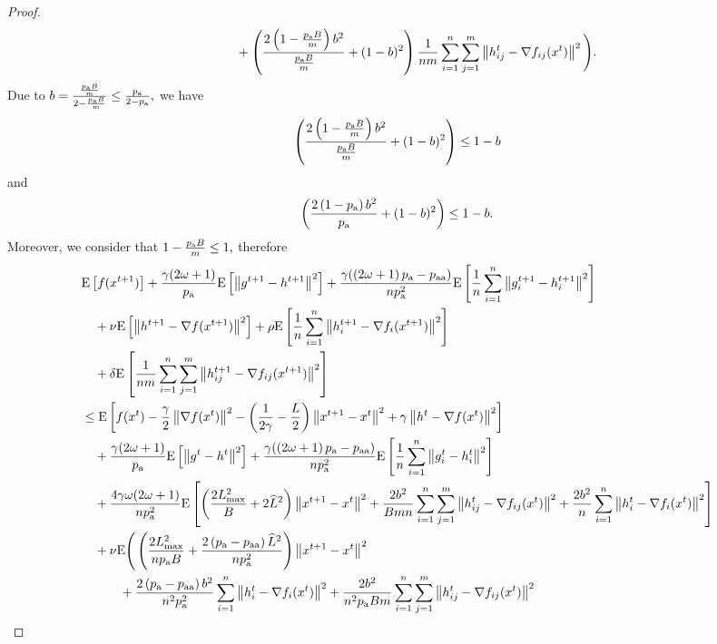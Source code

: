 \documentclass{article}
\newcommand*{\probavailable}{\ensuremath{p_{\textnormal{a}}}}
\newcommand*{\probpairaa}{\ensuremath{p_{\textnormal{aa}}}}
\begin{document}
\begin{proof}
\begin{align*}
      &\qquad\quad + \left(\frac{2\left(1 - \frac{\probavailable B}{m}\right) b^2}{\frac{\probavailable B}{m}} + (1 - b)^2\right) \frac{1}{nm} \sum_{i=1}^n \sum_{j=1}^m \norm{h^t_{ij} - \nabla f_{ij}(x^{t})}^2\Bigg).\\
    \end{align*}
    Due to $b = \frac{\frac{\probavailable B}{m}}{2 - \frac{\probavailable B}{m}} \leq \frac{\probavailable}{2 - \probavailable},$ we have 
    $$\left(\frac{2\left(1 - \frac{\probavailable B}{m}\right) b^2}{\frac{\probavailable B}{m}} + (1 - b)^2\right) \leq 1 - b$$
    and
    $$\left(\frac{2 \left(1 - \probavailable\right) b^2}{\probavailable} + (1 - b)^2\right) \leq 1 - b.$$
    Moreover, we consider that $1 - \frac{\probavailable B}{m} \leq 1,$ therefore
    \begin{align*}
      &\Exp{f(x^{t + 1})} + \frac{\gamma (2 \omega + 1)}{\probavailable} \Exp{\norm{g^{t+1} - h^{t+1}}^2} + \frac{\gamma (\left(2 \omega + 1\right)\probavailable - \probpairaa)}{n \probavailable^2} \Exp{\frac{1}{n}\sum_{i=1}^n\norm{g^{t+1}_i - h^{t+1}_i}^2}\\
      &\quad  + \nu \Exp{\norm{h^{t+1} - \nabla f(x^{t+1})}^2} + \rho \Exp{\frac{1}{n}\sum_{i=1}^n\norm{h^{t+1}_i - \nabla f_i(x^{t+1})}^2}\\
      &\quad + \delta \Exp{\frac{1}{nm}\sum_{i=1}^n\sum_{j=1}^m\norm{h^{t+1}_{ij} - \nabla f_{ij}(x^{t+1})}^2} \\
      &\leq \Exp{f(x^t) - \frac{\gamma}{2}\norm{\nabla f(x^t)}^2 - \left(\frac{1}{2\gamma} - \frac{L}{2}\right)
      \norm{x^{t+1} - x^t}^2 + \gamma \norm{h^{t} - \nabla f(x^t)}^2}\nonumber\\
      &\quad + \frac{\gamma (2 \omega + 1)}{\probavailable}\Exp{\norm{g^{t} - h^t}^2}+ \frac{\gamma (\left(2 \omega + 1\right)\probavailable - \probpairaa)}{n \probavailable^2}\Exp{\frac{1}{n} \sum_{i=1}^n\norm{g^t_i - h^{t}_i}^2} \\
      &\quad + \frac{4 \gamma \omega (2 \omega + 1)}{n \probavailable^2} \Exp{\left(\frac{2 L_{\max}^2}{B} + 2 \widehat{L}^2\right)\norm{x^{t+1} - x^{t}}^2 + \frac{2 b^2}{B m n}\sum_{i=1}^n \sum_{j=1}^m\norm{h^t_{ij} - \nabla f_{ij}(x^{t})}^2 + \frac{2 b^2}{n} \sum_{i=1}^n \norm{h^t_i - \nabla f_i(x^{t})}^2} \\
      &\quad  + \nu {\rm E}\Bigg(\left(\frac{2 L_{\max}^2}{n \probavailable B} + \frac{2 \left(\probavailable - \probpairaa\right) \widehat{L}^2}{n \probavailable^2}\right)\norm{x^{t+1} - x^{t}}^2  \\
      &\qquad\quad + \frac{2\left(\probavailable - \probpairaa\right)b^2}{n^2 \probavailable^2}\sum_{i=1}^n\norm{h^t_{i} - \nabla f_{i}(x^{t})}^2 + \frac{2b^2}{n^2 \probavailable B m}\sum_{i=1}^n\sum_{j=1}^m\norm{h^t_{ij} - \nabla f_{ij}(x^{t})}^2 \\

\end{align*}
\end{proof}
\end{document}

